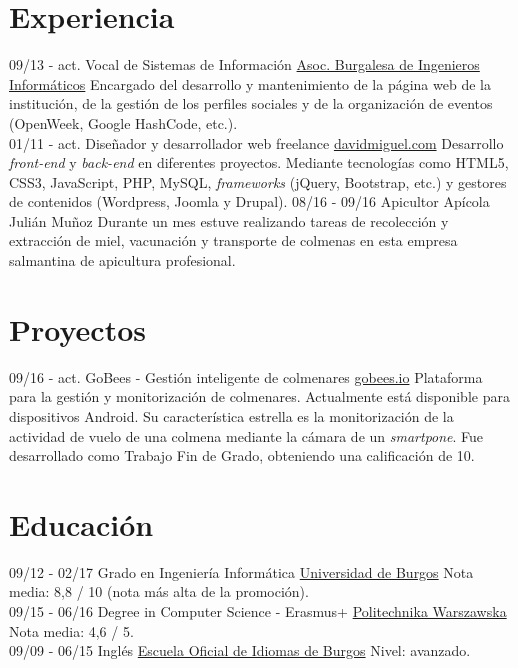 \documentclass[]{friggeri-cv}
\begin{document}
\section{Experiencia}
\begin{entrylist}
    \entry
    {09/13 - act.}
    {Vocal de Sistemas de Información}
    {\href{http://abi2burgos.es/}{Asoc. Burgalesa de Ingenieros Informáticos}}
    {Encargado del desarrollo y mantenimiento de la página web de la institución, de la gestión de los perfiles sociales y de la organización de eventos (OpenWeek, Google HashCode, etc.).\\}
    \entry
    {01/11 - act.}
    {Diseñador y desarrollador web freelance}
    {\href{http://davidmiguel.com/}{davidmiguel.com}}
    {Desarrollo \textit{front-end} y \textit{back-end} en diferentes proyectos. Mediante tecnologías como HTML5, CSS3, JavaScript, PHP, MySQL, \textit{frameworks} (jQuery, Bootstrap, etc.) y gestores de contenidos (Wordpress, Joomla y Drupal).
    }
    \entry
    {08/16 - 09/16}
    {Apicultor}
    {Apícola Julián Muñoz}
    {Durante un mes estuve realizando tareas de recolección y extracción de miel, vacunación y transporte de colmenas en esta empresa salmantina de apicultura profesional.\\}
\end{entrylist}

\section{Proyectos}
\begin{entrylist}
  \entry
    {09/16 - act.}
    {GoBees - Gestión inteligente de colmenares}
    {\href{http://gobees.io/}{gobees.io}}
    {Plataforma para la gestión y monitorización de colmenares. Actualmente está disponible para dispositivos Android. Su característica estrella es la monitorización de la actividad de vuelo de una colmena mediante la cámara de un \emph{smartpone}. Fue desarrollado como Trabajo Fin de Grado, obteniendo una calificación de 10.}
\end{entrylist}

\section{Educación}
\begin{entrylist}
  \entry
    {09/12 - 02/17}
    {Grado en Ingeniería Informática}
    {\href{http://wwww.ubu.es/}{Universidad de Burgos}}
    {Nota media: 8,8 / 10 (nota más alta de la promoción).\\}
  \entry
    {09/15 - 06/16}
    {Degree in Computer Science - Erasmus+}
    {\href{https://www.pw.edu.pl/}{Politechnika Warszawska}}
    {Nota media: 4,6 / 5.\\}
  \entry
    {09/09 - 06/15}
    {Inglés}
    {\href{http://eoiburgos.centros.educa.jcyl.es/}{Escuela Oficial de Idiomas de Burgos}}
    {Nivel: avanzado.\\}
\end{entrylist}
\end{document}
